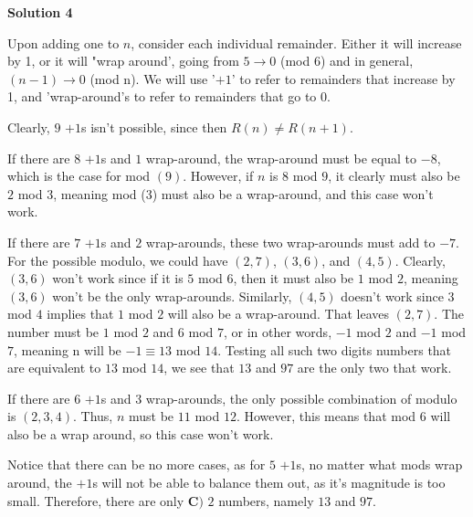 \begin{enumerate}
 


 



\textbf{Solution 4}

Upon adding one to $n$, consider each individual remainder. Either it will increase by 1, or it will "wrap around', going from $5\rightarrow 0$ (mod 6) and in general, $(n-1) \rightarrow 0$ (mod n). We will use '$+1$' to refer to remainders that increase by 1, and 'wrap-around's to refer to remainders that go to 0.

 
Clearly, $9$ $+1$s isn't possible, since then $R(n)\ne R(n+1)$.

 
If there are $8$ $+1$s and $1$ wrap-around, the wrap-around must be equal to $-8$, which is the case for mod $(9)$. However, if $n$ is $8$ mod $9$, it clearly must also be $2$ mod $3$, meaning mod (3) must also be a wrap-around, and this case won't work.

 
If there are $7$ $+1$s and $2$ wrap-arounds, these two wrap-arounds must add to $-7$. For the possible modulo, we could have $(2,7)$, $(3,6)$, and $(4,5)$. Clearly, $(3,6)$ won't work since if it is $5$ mod $6$, then it must also be $1$ mod $2$, meaning $(3,6)$ won't be the only wrap-arounds. Similarly, $(4,5)$ doesn't work since $3$ mod $4$ implies that $1$ mod $2$ will also be a wrap-around. That leaves $(2,7)$. The number must be $1$ mod $2$ and $6$ mod $7$, or in other words, $-1$ mod $2$ and $-1$ mod $7$, meaning n will be $-1 \equiv 13$ mod $14$. Testing all such two digits numbers that are equivalent to $13$ mod $14$, we see that $13$ and $97$ are the only two that work.

 
If there are $6$ $+1$s and $3$ wrap-arounds, the only possible combination of modulo is $(2,3,4)$. Thus, $n$ must be $11$ mod $12$. However, this means that mod $6$ will also be a wrap around, so this case won't work.

 
Notice that there can be no more cases, as for $5$ $+1$s, no matter what mods wrap around, the $+1$s will not be able to balance them out, as it's magnitude is too small. Therefore, there are only $\boxed{\textbf{C) }2}$ numbers, namely $13$ and $97$.

 


 


\end{enumerate}